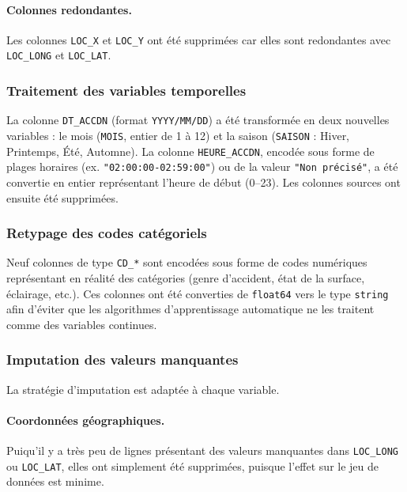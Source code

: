 \documentclass[11pt]{article}
\begin{document}
\paragraph{Colonnes redondantes.}
Les colonnes \texttt{LOC\_X} et \texttt{LOC\_Y} ont été supprimées
car elles sont redondantes avec \texttt{LOC\_LONG} et \texttt{LOC\_LAT}.
 
\subsubsection{Traitement des variables temporelles}
 
La colonne \texttt{DT\_ACCDN} (format \texttt{YYYY/MM/DD}) a été
transformée en deux nouvelles variables : le mois (\texttt{MOIS},
entier de 1 à 12) et la saison (\texttt{SAISON} : Hiver, Printemps,
Été, Automne). La colonne \texttt{HEURE\_ACCDN}, encodée sous forme
de plages horaires (ex. \texttt{"02:00:00-02:59:00"}) ou de la valeur
\texttt{"Non précisé"}, a été convertie en entier représentant
l'heure de début (0--23). Les colonnes sources ont ensuite été supprimées.
 
\subsubsection{Retypage des codes catégoriels}
 
Neuf colonnes de type \texttt{CD\_*} sont encodées sous forme de codes
numériques représentant en réalité des catégories (genre d'accident,
état de la surface, éclairage, etc.). Ces colonnes ont été converties
de \texttt{float64} vers le type \texttt{string} afin d'éviter que les
algorithmes d'apprentissage automatique ne les traitent comme des
variables continues.
 
\subsubsection{Imputation des valeurs manquantes}
 
La stratégie d'imputation est adaptée à chaque variable.
 
\paragraph{Coordonnées géographiques.}
Puiqu'il y a très peu de lignes présentant des valeurs manquantes dans
\texttt{LOC\_LONG} ou \texttt{LOC\_LAT}, elles ont simplement été supprimées, puisque l'effet sur le jeu de données est minime.
 
\end{document}
